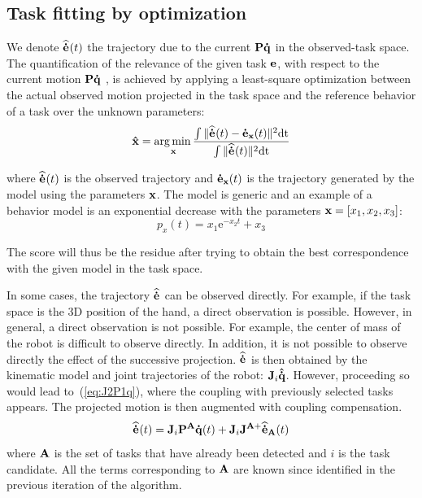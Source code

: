 \documentclass[journal]{IEEEtran}
\begin{document}
\newcommand{\medot}[1]{\mbf{\dot{e}}_{#1}}
\newcommand{\mqdot}{\mbf{\dot{q}}}
\newcommand{\mP}[1]{\mbf{P}_{#1}}
\newcommand{\mJ}[1]{\mbf{J}_{#1}}
\newcommand{\mJp}[1]{\mbf{J}_{#1}^+}
\newcommand{\medotc}[1]{\medot{#1}^*}
\newcommand{\medoth}[1]{\mbf{\widehat{\dot{e}}}_{#1}}
\newcommand{\medothp}[2]{\medoth{#1|#2}}

\subsection{Task fitting by optimization} \label{sec:alg2:proj}
We denote $\medoth{}(t)$ the trajectory due to the current ${\mathbf{P}}
{\mathbf{\dot{q}}}$ in the observed-task space.  The quantification of the
relevance of the given task ${\mathbf{e}}$, with respect to the current motion
${\mathbf{P}} {\mathbf{\dot{q}}}$ , is achieved by applying a least-square
optimization between the actual observed motion projected in the task space and
the reference behavior of a task over the unknown parameters:
\begin{equation}
  \mbf{\hat x} = \underset{\mbf{x}}\argmin \frac{\int \Vert \medoth{}(t) - \medot{\mbf x}(t) \Vert^2 \mathrm{dt}}{\int \Vert \medoth{}(t) \Vert^2 \mathrm{dt}}
\label{optimProblem}
\end{equation}

\noindent where $\medoth{}(t)$ is the observed trajectory and $\medot{\mbf{x}}(t)$ is the trajectory
generated by the model using the parameters ${\mathbf{x}}$. The model is generic and an example
of a behavior model is an exponential decrease with the parameters ${\mathbf{x}} = [x_1, x_2, x_3]$:
\begin{equation*}
p_x(t) = x_1 \mathrm{e}^{-x_2 t} + x_3
\end{equation*}

The score will thus be the residue after trying to obtain the best correspondence with the given
model in the task space.

In some cases, the trajectory $\medoth{}$ can be observed directly. For example, if the task space
is the 3D position of the hand, a direct observation is possible.
However, in general, a direct observation is not possible. For example,
the center of mass of the robot is difficult to observe directly.
In addition, it is not possible to observe directly the effect of the successive projection.
$\medoth{}$ is then obtained by the kinematic model and
joint trajectories of the robot: ${\mathbf{J}}_i{\mathbf{\hat{\dot{q}}}}$.
However, proceeding so would lead to~(\ref{eq:J2P1q}), where the coupling with previously
selected tasks appears. The projected motion is then augmented with coupling compensation.
\begin{equation}
  \medoth{}(t) = \mbf{J}_i\mbf{P}^{\mbf{A}} \mbf{\dot{q}}(t) + \mbf{J}_i\mbf{J}^{\mbf{A}+}\medoth{\mbf{A}}(t)
  \label{eq:compensation}
\end{equation}
where ${\mathbf{A}}$ is the set of tasks that have already been detected and $i$ is the task candidate.
All the terms corresponding to ${\mathbf{A}}$ are known since identified in the previous
iteration of the algorithm.
\end{document}
